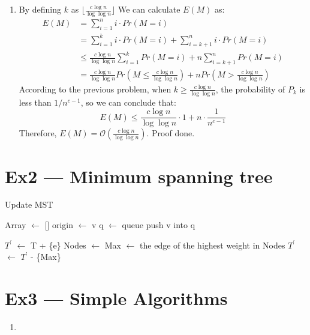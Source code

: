 \documentclass[12pt, a4paper]{article}
\begin{document}
\begin{enumerate}
    \item By defining $k$ as $\lfloor \frac{c\log n}{\log \log n} \rfloor$ We can calculate $E(M)$ as: 
          \begin{align*}
            E(M) &= \sum_{i=1}^n i\cdot Pr(M = i)\\
                 &= \sum_{i=1}^{k} i\cdot Pr(M = i) + \sum_{i=k+1}^n i\cdot Pr(M = i)\\
                 &\leq \frac{c\log n}{\log \log n}\sum_{i=1}^k Pr(M = i) + n\sum_{i=k+1}^n Pr(M = i)\\
                 &= \frac{c\log n}{\log \log n} Pr(M \leq \frac{c\log n}{\log \log n}) + n Pr(M > \frac{c\log n}{\log \log n})
          \end{align*}
          According to the previous problem, when $k \geq \frac{c\log n}{\log \log n}$, 
          the probability of $P_k$ is less than $1/n^{c-1}$, so we can conclude that: 
          $$E(M) \leq \frac{c\log n}{\log \log n} \cdot 1 + n \cdot \frac{1}{n^{c-1}}$$
          Therefore, $E(M) = \mathcal{O}(\frac{c\log n}{\log \log n})$. Proof done.

\end{enumerate}

\section*{Ex2 --- Minimum spanning tree}
\begin{algorithm}[H]
    \caption{Update MST}

     {
        Array $\leftarrow$ []\;
        origin $\leftarrow$ v\;
        q $\leftarrow$ queue\;
        push v into q\;

        \;
    }

     {
        $T^\prime$ $\leftarrow$ T + \{e\}\;
        Nodes $\leftarrow$ \;
        Max $\leftarrow$ the edge of the highest weight in Nodes\;
        $T^\prime$ $\leftarrow$ $T^\prime$ - \{Max\}\;
    }

\end{algorithm}

\section*{Ex3 --- Simple Algorithms}
\begin{enumerate}
    \item 
\end{enumerate}
\end{document}
